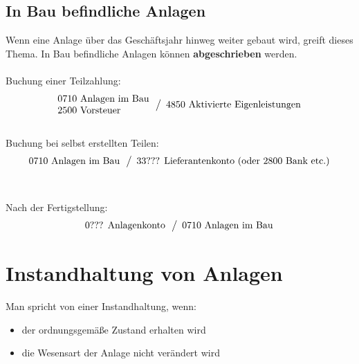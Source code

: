 \documentclass[a4paper,9pt]{article}
\begin{document}
\subsection{In Bau befindliche Anlagen}
Wenn eine Anlage über das Geschäftsjahr hinweg weiter gebaut wird,
greift dieses Thema. In Bau befindliche Anlagen können
\textbf{abgeschrieben} werden.\\
\\
Buchung einer Teilzahlung:
\begin{equation*}
  \begin{array}{l}
    \text{0710 Anlagen im Bau}\\
    \text{2500 Vorsteuer}\\
  \end{array}
  \left\slash
    \begin{array}{l}
      \text{4850 Aktivierte Eigenleistungen}\\
    \end{array}
  \right.
\end{equation*}
\\
Buchung bei selbst erstellten Teilen:
\begin{equation*}
  \begin{array}{l}
    \text{0710 Anlagen im Bau}\\
  \end{array}
  \left\slash
    \begin{array}{l}
      \text{33??? Lieferantenkonto (oder 2800 Bank etc.)}\\
    \end{array}
  \right.
\end{equation*}\\
\\
Nach der Fertigstellung:
\begin{equation*}
  \begin{array}{l}
    \text{0??? Anlagenkonto}\\
  \end{array}
  \left\slash
    \begin{array}{l}
      \text{0710 Anlagen im Bau}\\
    \end{array}
  \right.
\end{equation*}

\section{Instandhaltung von Anlagen}
Man spricht von einer Instandhaltung, wenn:
\begin{itemize}
  \item der ordnungsgemäße Zustand erhalten wird
  \item die Wesensart der Anlage nicht verändert wird
\end{itemize}
\end{document}
